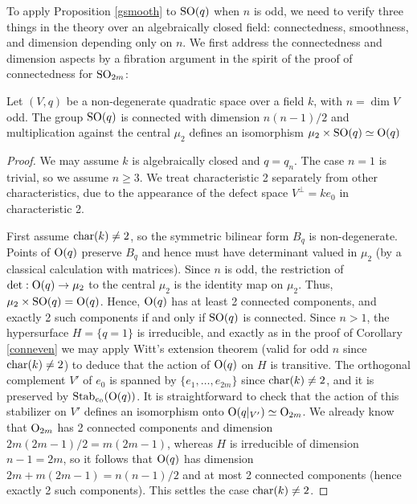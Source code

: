 \documentclass[10pt]{article}
\renewcommand{\(}{\left(}
\renewcommand{\)}{\right)}
\numberwithin{thm}{subsection}
\begin{document}
To apply Proposition \ref{gsmooth} to ${\rm{SO}}(q)$ when $n$ is odd,
we need to verify three things in the theory over an algebraically
closed field:  connectedness, smoothness, and dimension depending only on $n$.
We first address the connectedness and dimension aspects by
a fibration argument in the spirit of the proof of connectedness for
${\rm{SO}}_{2m}$:

\begin{prop}\label{smodd} Let $(V,q)$ be a non-degenerate
quadratic space over a field $k$, with $n = \dim V$ odd.  
The group ${\rm{SO}}(q)$ is connected with dimension $n(n-1)/2$
and multiplication against the central $\mu_2$
defines an isomorphism $\mu_2 \times {\rm{SO}}(q) \simeq {\rm{O}}(q)$
\end{prop}

\begin{proof}
We may assume $k$ is algebraically closed and
$q = q_n$.  The case $n = 1$ is trivial, so
we assume $n \ge 3$.  We treat characteristic 2 separately from other
characteristics, due to the appearance of the defect space $V^{\perp} = k e_0$
in characteristic 2.

First assume ${\rm{char}}(k) \ne 2$, so the symmetric bilinear form $B_q$ is non-degenerate.
Points of ${\rm{O}}(q)$ preserve $B_q$ and hence must have determinant 
valued in $\mu_2$ (by a classical calculation with matrices).  Since $n$ is odd,
the restriction of $\det: {\rm{O}}(q) \rightarrow \mu_2$ to the central 
$\mu_2$ is the identity map on $\mu_2$.  Thus,
$\mu_2 \times {\rm{SO}}(q) = {\rm{O}}(q)$.  
Hence, ${\rm{O}}(q)$ has at least 2 connected components,
and exactly 2 such components if and only if ${\rm{SO}}(q)$ is connected.
Since $n > 1$, the hypersurface $H = \{q = 1\}$ is irreducible,
and exactly as in
the proof of Corollary \ref{conneven}
we may apply Witt's extension theorem (valid for odd $n$ since ${\rm{char}}(k) \ne 2$)
to deduce that the action of ${\rm{O}}(q)$ on $H$ is transitive.
The orthogonal complement $V'$ of $e_0$ is spanned
by $\{e_1,\dots,e_{2m}\}$ since ${\rm{char}}(k) \ne 2$, and 
it is preserved by ${\rm{Stab}}_{e_0}({\rm{O}}(q))$.
It is straightforward to check that the action of this stabilizer
on $V'$ defines an isomorphism onto ${\rm{O}}(q|_{V'}) \simeq
{\rm{O}}_{2m}$.  We already know
that ${\rm{O}}_{2m}$ has 2 connected components
and dimension $2m(2m-1)/2 = m(2m-1)$,
whereas $H$ is irreducible of dimension $n-1 = 2m$,
so it follows that ${\rm{O}}(q)$ has dimension
$2m + m(2m-1) = n(n-1)/2$ and at most 2 connected
components (hence exactly 2 such components).   This
settles
the case ${\rm{char}}(k) \ne 2$.


\end{proof}
\end{document}
